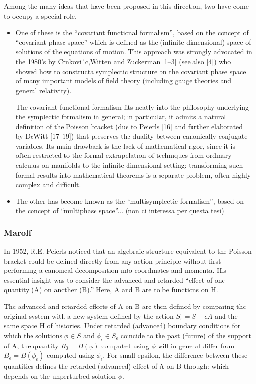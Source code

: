 \documentclass[Main]{subfiles}
\begin{document}
			Among the many ideas that have been proposed in this direction, two have come to occupy a special role. 
			\begin{itemize}
				\item  One of these is the “covariant functional formalism”, based on the concept 	of “covariant phase space” which is defined as the (infinite-dimensional) space of solutions of the equations of motion.
					This approach was strongly advocated in the 1980’s by Crnkovi´c,Witten and Zuckerman [1–3] (see also [4]) who showed how to constructa symplectic structure on the covariant phase space of many important models of field theory (including gauge theories and general relativity).
				
					The covariant functional formalism fits neatly into the philosophy underlying the symplectic formalism in general; in particular, it admits a natural definition of the Poisson bracket (due to Peierls [16] and further elaborated by DeWitt [17–19]) that preserves the duality between canonically conjugate variables. 
					Its main drawback is the lack of mathematical rigor, since it is often restricted to the formal extrapolation of techniques from ordinary calculus on manifolds to the infinite-dimensional setting: transforming such formal results into mathematical theorems is a separate problem, often highly complex and difficult.
					
				\item The other has become known as the “multisymplectic formalism”, based on the concept of “multiphase space”... (non ci interessa per questa tesi)
			\end{itemize}			

		\subsubsection{Marolf}
			In 1952, R.E. Peierls noticed that an algebraic structure equivalent to the Poisson bracket could be defined directly from any action principle without first performing a canonical decomposition into coordinates and momenta. 
			His essential insight was to consider the advanced and retarded “effect of one quantity (A) on another (B).” Here, A and B are to
be functions on H. 

			The advanced  and retarded  effects of A on B are then defined by comparing the original system with a new system defined by the action $S_\epsilon = S + \epsilon A$ and the same space H of histories. 
			Under retarded (advanced) boundary conditions for which the solutions $\phi \in S$ and $\phi_\epsilon	\in S_\epsilon$ coincide to the past (future) of the support of A, the quantity $B_0 = B(\phi)$ computed using $\phi$ will in general differ from $B_\epsilon = B(\phi_\epsilon)$ computed using $\phi_\epsilon$.
			For small epsilon, the difference between these quantities defines the retarded (advanced) effect of A on B through:
which depends on the unperturbed solution $\phi$.
\end{document}
